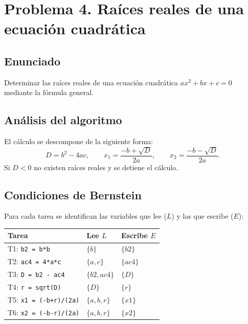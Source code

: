 \section{Problema 4. Ra\'ices reales de una ecuaci\'on cuadr\'atica}

\subsection*{Enunciado}
Determinar las ra\'ices reales de una ecuaci\'on cuadr\'atica
$ax^2 + bx + c = 0$ mediante la f\'ormula general.

\subsection*{An\'alisis del algoritmo}
El c\'alculo se descompone de la siguiente forma:
\[
    D = b^2 - 4ac, \qquad
    x_1 = \frac{-b + \sqrt{D}}{2a}, \qquad
    x_2 = \frac{-b - \sqrt{D}}{2a}.
\]
Si $D < 0$ no existen ra\'ices reales y se detiene el c\'alculo.

\subsection*{Condiciones de Bernstein}
Para cada tarea se identifican las variables que lee ($L$) y las que escribe
($E$):

\begin{center}
\begin{tabular}{lll}
\toprule
Tarea & Lee $L$ & Escribe $E$ \\
\midrule
T1: \texttt{b2 = b*b}          & $\{b\}$            & $\{b2\}$  \\
T2: \texttt{ac4 = 4*a*c}       & $\{a,c\}$          & $\{ac4\}$ \\
T3: \texttt{D = b2 - ac4}      & $\{b2,ac4\}$       & $\{D\}$   \\
T4: \texttt{r = sqrt(D)}       & $\{D\}$            & $\{r\}$   \\
T5: \texttt{x1 = (-b+r)/(2a)}  & $\{a,b,r\}$        & $\{x1\}$  \\
T6: \texttt{x2 = (-b-r)/(2a)}  & $\{a,b,r\}$        & $\{x2\}$  \\
\bottomrule
\end{tabular}
\end{center}

